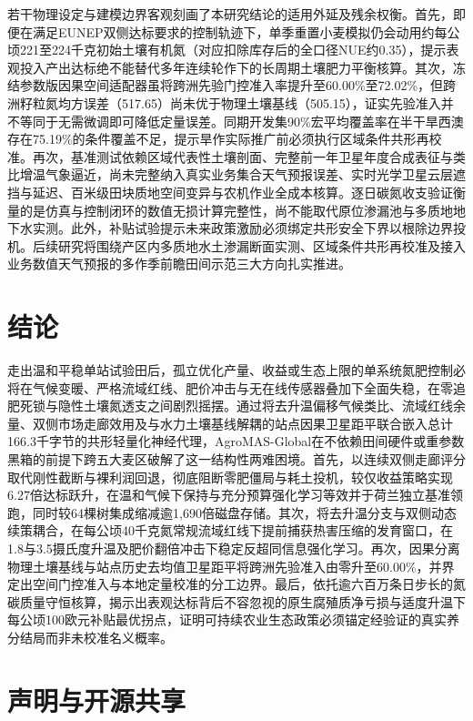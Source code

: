 \documentclass[11pt,a4paper]{article}
\begin{document}
若干物理设定与建模边界客观刻画了本研究结论的适用外延及残余权衡。首先，即便在满足EUNEP双侧达标要求的控制轨迹下，单季重置小麦模拟仍会动用约每公顷221至224千克初始土壤有机氮（对应扣除库存后的全口径NUE约0.35），提示表观投入产出达标绝不能替代多年连续轮作下的长周期土壤肥力平衡核算。其次，冻结参数版因果空间适配器虽将跨洲先验门控准入率提升至60.00\%至72.02\%，但跨洲籽粒氮均方误差（517.65）尚未优于物理土壤基线（505.15），证实先验准入并不等同于无需微调即可降低定量误差。同期开发集90\%宏平均覆盖率在半干旱西澳存在75.19\%的条件覆盖不足，提示旱作实际推广前必须执行区域条件共形再校准。再次，基准测试依赖区域代表性土壤剖面、完整前一年卫星年度合成表征与类比增温气象逼近，尚未完整纳入真实业务集合天气预报误差、实时光学卫星云层遮挡与延迟、百米级田块质地空间变异与农机作业全成本核算。逐日碳氮收支验证衡量的是仿真与控制闭环的数值无损计算完整性，尚不能取代原位渗漏池与多质地地下水实测。此外，补贴试验提示未来政策激励必须绑定共形安全下界以根除边界投机。后续研究将围绕产区内多质地水土渗漏断面实测、区域条件共形再校准及接入业务数值天气预报的多作季前瞻田间示范三大方向扎实推进。

\FloatBarrier

\section{结论}

走出温和平稳单站试验田后，孤立优化产量、收益或生态上限的单系统氮肥控制必将在气候变暖、严格流域红线、肥价冲击与无在线传感器叠加下全面失稳，在零追肥死锁与隐性土壤氮透支之间剧烈摇摆。通过将去升温偏移气候类比、流域红线余量、双侧市场走廊效用及与水力土壤基线解耦的站点因果卫星距平联合嵌入总计166.3千字节的共形轻量化神经代理，AgroMAS-Global在不依赖田间硬件或重参数黑箱的前提下跨五大麦区破解了这一结构性两难困境。首先，以连续双侧走廊评分取代刚性截断与裸利润回退，彻底阻断零肥僵局与耗土投机，较仅收益策略实现6.27倍达标跃升，在温和气候下保持与充分预算强化学习等效并于荷兰独立基准领跑，同时较64棵树集成缩减逾1,690倍磁盘存储。其次，将去升温分支与双侧动态续策耦合，在每公顷40千克氮常规流域红线下提前捕获热害压缩的发育窗口，在1.8与3.5摄氏度升温及肥价翻倍冲击下稳定反超同信息强化学习。再次，因果分离物理土壤基线与站点历史去均值卫星距平将跨洲先验准入由零升至60.00\%，并界定出空间门控准入与本地定量校准的分工边界。最后，依托逾六百万条日步长的氮碳质量守恒核算，揭示出表观达标背后不容忽视的原生腐殖质净亏损与适度升温下每公顷100欧元补贴最优拐点，证明可持续农业生态政策必须锚定经验证的真实养分结局而非未校准名义概率。

\FloatBarrier

\section{声明与开源共享}
\end{document}
